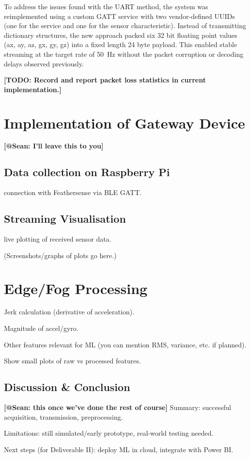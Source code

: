 \documentclass[conference]{lib/IEEEtran}
\begin{document}
To address the issues found with the UART method, the system was reimplemented using a custom GATT service with two vendor-defined UUIDs (one for the service and one for the sensor characteristic). Instead of transmitting dictionary structures, the new approach packed six 32 bit floating point values (ax, ay, az, gx, gy, gz) into a fixed length 24 byte payload. This enabled stable streaming at the target rate of 50~Hz without the packet corruption or decoding delays observed previously.

\textbf{[TODO: Record and report packet loss statistics in current implementation.]} 




\section{Implementation of Gateway Device}
\textbf{[@Sean: I'll leave this to you]} 
\subsection{Data collection on Raspberry Pi}
connection with Feathersense via BLE GATT.

\subsection{Streaming Visualisation}
 live plotting of received sensor data.

(Screenshots/graphs of plots go here.)

\section{Edge/Fog Processing}
Jerk calculation (derivative of acceleration).

Magnitude of accel/gyro.

Other features relevant for ML (you can mention RMS, variance, etc. if planned).

Show small plots of raw vs processed features.


\subsection{Discussion \& Conclusion}
\textbf{[@Sean: this once we've done the rest of course]} 
Summary: successful acquisition, transmission, preprocessing.

Limitations: still simulated/early prototype, real-world testing needed.

Next steps (for Deliverable II): deploy ML in cloud, integrate with Power BI.



\end{document}
